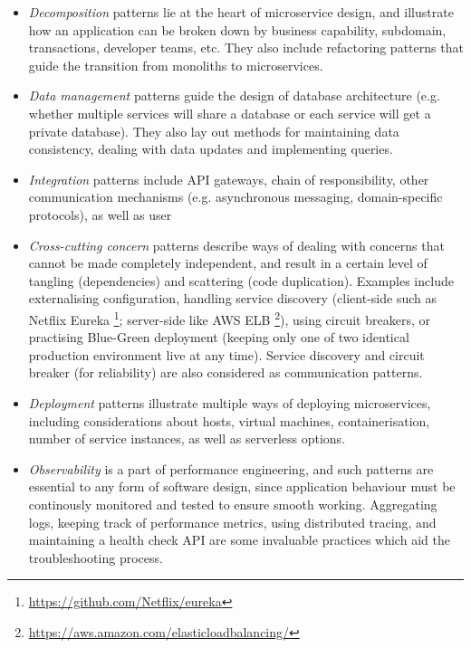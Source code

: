 \begin{itemize}
  \item \textit{Decomposition} patterns lie at the heart of microservice design, and illustrate how an application can be broken down by business capability, subdomain, transactions, developer teams, etc. They also include refactoring patterns that guide the transition from monoliths to microservices.

  \item \textit{Data management} patterns guide the design of database architecture (e.g. whether multiple services will share a database or each service will get a private database). They also lay out methods for maintaining data consistency, dealing with data updates and implementing queries.

  \item \textit{Integration} patterns include API gateways, chain of responsibility, other communication mechanisms (e.g. asynchronous messaging, domain-specific protocols), as well as user 
  \item \textit{Cross-cutting concern} patterns describe ways of dealing with concerns that cannot be made completely independent, and result in a certain level of tangling (dependencies) and scattering (code duplication). Examples include externalising configuration, handling service discovery (client-side such as Netflix Eureka \footnote{\url{https://github.com/Netflix/eureka}}; server-side like AWS ELB \footnote{\url{https://aws.amazon.com/elasticloadbalancing/}}), using circuit breakers, or practising Blue-Green deployment (keeping only one of two identical production environment live at any time). Service discovery and circuit breaker (for reliability) are also considered as communication patterns.

  \item \textit{Deployment} patterns illustrate multiple ways of deploying microservices, including considerations about hosts, virtual machines, containerisation, number of service instances, as well as serverless options.  

  \item \textit{Observability} is a part of performance engineering, and such patterns are essential to any form of software design, since application behaviour must be continously monitored and tested to ensure smooth working. Aggregating logs, keeping track of performance metrics, using distributed tracing, and maintaining a health check API are some invaluable practices which aid the troubleshooting process.
\end{itemize}

